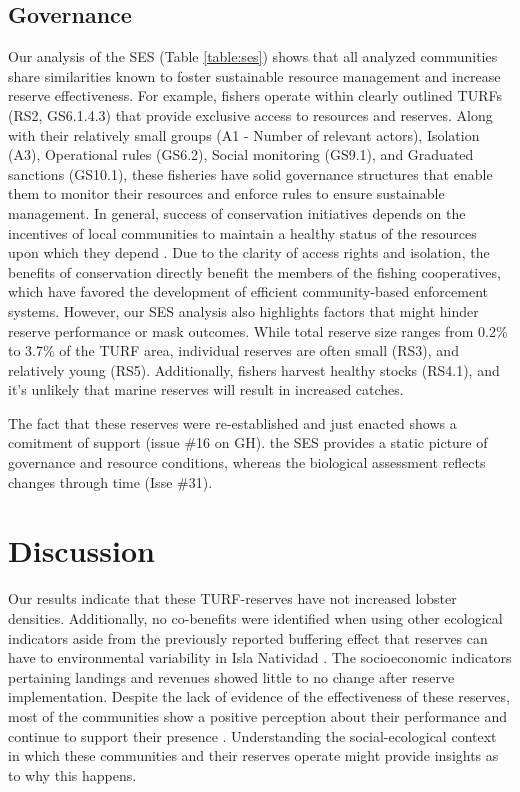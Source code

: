 \documentclass{frontiersSCNS}
\begin{document}
\hypertarget{governance}{%
\subsection{Governance}\label{governance}}

Our analysis of the SES (Table \ref{table:ses}) shows that all analyzed
communities share similarities known to foster sustainable resource
management and increase reserve effectiveness. For example, fishers
operate within clearly outlined TURFs (RS2, GS6.1.4.3) that provide
exclusive access to resources and reserves. Along with their relatively
small groups (A1 - Number of relevant actors), Isolation (A3),
Operational rules (GS6.2), Social monitoring (GS9.1), and Graduated
sanctions (GS10.1), these fisheries have solid governance structures
that enable them to monitor their resources and enforce rules to ensure
sustainable management. In general, success of conservation initiatives
depends on the incentives of local communities to maintain a healthy
status of the resources upon which they depend \citep{jupiter_2017}. Due
to the clarity of access rights and isolation, the benefits of
conservation directly benefit the members of the fishing cooperatives,
which have favored the development of efficient community-based
enforcement systems. However, our SES analysis also highlights factors
that might hinder reserve performance or mask outcomes. While total
reserve size ranges from 0.2\% to 3.7\% of the TURF area, individual
reserves are often small (RS3), and relatively young (RS5).
Additionally, fishers harvest healthy stocks (RS4.1), and it's unlikely
that marine reserves will result in increased catches.

The fact that these reserves were re-established and just enacted shows
a comitment of support (issue \#16 on GH). the SES provides a static
picture of governance and resource conditions, whereas the biological
assessment reflects changes through time (Isse \#31).

\hypertarget{discussion}{%
\section{Discussion}\label{discussion}}

Our results indicate that these TURF-reserves have not increased lobster
densities. Additionally, no co-benefits were identified when using other
ecological indicators aside from the previously reported buffering
effect that reserves can have to environmental variability in Isla
Natividad \citep{micheli_2012-EU}. The socioeconomic indicators
pertaining landings and revenues showed little to no change after
reserve implementation. Despite the lack of evidence of the
effectiveness of these reserves, most of the communities show a positive
perception about their performance and continue to support their
presence \citep{ayer_2018}. Understanding the social-ecological context
in which these communities and their reserves operate might provide
insights as to why this happens.
\end{document}

